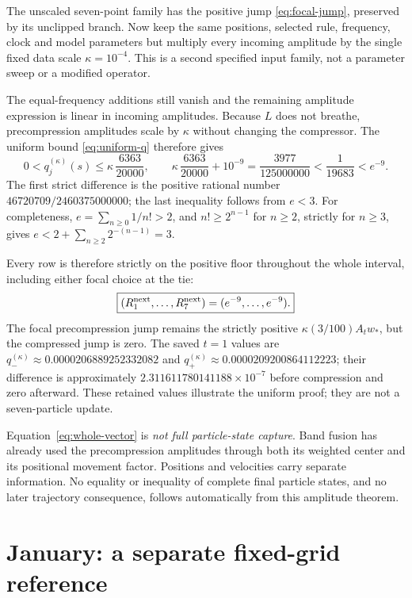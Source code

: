 \documentclass[11pt,a4paper]{article}
\theoremstyle{remark}\newtheorem{remark}[theorem]{Remark}
\numberwithin{equation}{section}
\begin{document}
The unscaled seven-point family has the positive jump
\eqref{eq:focal-jump}, preserved by its unclipped branch. Now keep the same
positions, selected rule, frequency, clock and model parameters but multiply
every incoming amplitude by the single fixed data scale $\kappa=10^{-4}$.
This is a second specified input family, not a parameter sweep or a
modified operator.

The equal-frequency additions still vanish and the remaining amplitude
expression is linear in incoming amplitudes. Because $L$ does not breathe,
precompression amplitudes scale by $\kappa$ without changing the compressor.
The uniform bound \eqref{eq:uniform-q} therefore gives
\begin{equation}
0<q_j^{(\kappa)}(s)\le\kappa\,\frac{6363}{20000},\qquad
\kappa\,\frac{6363}{20000}+10^{-9}
=\frac{3977}{125000000}<\frac1{19683}<e^{-9}.
\label{eq:scaled-bound}
\end{equation}
The first strict difference is the positive rational number
$46720709/2460375000000$; the last inequality follows from $e<3$.
For completeness, $e=\sum_{n\ge0}1/n!>2$, and
$n!\ge2^{n-1}$ for $n\ge2$, strictly for $n\ge3$, gives
$e<2+\sum_{n\ge2}2^{-(n-1)}=3$.

Every row is therefore strictly on the positive floor throughout the
whole interval, including either focal choice at the tie:
\begin{equation}
\boxed{(R_1^{\rm next},\ldots,R_7^{\rm next})
       =(e^{-9},\ldots,e^{-9}).}\label{eq:whole-vector}
\end{equation}
The focal precompression jump remains the strictly positive
$\kappa(3/100)A_tw_*$, but the compressed jump is zero.
The saved $t=1$ values are
$q_-^{(\kappa)}\approx0.0000206889252332082$ and
$q_+^{(\kappa)}\approx0.0000209200864112223$; their difference is approximately
$2.311611780141188\times10^{-7}$ before compression and zero afterward.
These retained values illustrate the uniform proof; they are not a
seven-particle update.

Equation~\eqref{eq:whole-vector} is \emph{not full particle-state capture}.
Band fusion has already used the precompression amplitudes through both
its weighted center and its positional movement factor.
Positions and velocities carry separate information.
No equality or inequality of complete final particle states, and no later
trajectory consequence, follows automatically from this amplitude theorem.

\section{January: a separate fixed-grid reference}\label{sec:january}
\end{document}
